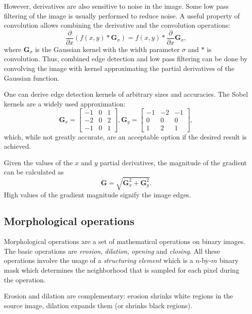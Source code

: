 \documentclass[a4paper,twoside,12pt]{article}
\begin{document}
However, derivatives are also sensitive to noise in the image. Some low pass filtering of the image is usually performed to reduce noise. A useful property of convolution allows combining the derivative and the convolution operations:
\begin{equation}
    \frac{\partial}{\partial x} (f(x, y) \ast \mathbf{G}_\sigma) =
    f(x, y) \ast \frac{\partial}{\partial x} \mathbf{G}_\sigma,
\end{equation}
where $\mathbf{G}_\sigma$ is the Gaussian kernel with the width parameter $\sigma$ and $\ast$ is convolution. Thus, combined edge detection and low pass filtering can be done by convolving the image with kernel approximating the partial derivatives of the Gaussian function.

One can derive edge detection kernels of arbitrary sizes and accuracies. The Sobel kernels are a widely used approximation:
\begin{equation}
    \mathbf{G}_x = \begin{bmatrix}
        -1 & 0 & 1 \\
        -2 & 0 & 2 \\
        -1 & 0 & 1
    \end{bmatrix},
    \mathbf{G}_y = \begin{bmatrix}
        -1 & -2 & -1 \\
        0 & 0 & 0 \\
        1 & 2 & 1
    \end{bmatrix},
\end{equation}
which, while not greatly accurate, are an acceptable option if the desired result is achieved.

Given the values of the $x$ and $y$ partial derivatives, the magnitude of the gradient can be calculated as
\[
    \mathbf{G} = \sqrt{\mathbf{G}_x^2 + \mathbf{G}_y^2}.
\]
High values of the gradient magnitude signify the image edges.

\subsection{Morphological operations}
Morphological operations are a set of mathematical operations on binary images. The basic operations are \emph{erosion}, \emph{dilation}, \emph{opening} and \emph{closing}. All these operations involve the usage of a \emph{structuring element} which is a $n$-by-$m$ binary mask which determines the neighborhood that is sampled for each pixel during the operation.

Erosion and dilation are complementary: erosion shrinks white regions in the source image, dilation expands them (or shrinks black regions).
\end{document}
